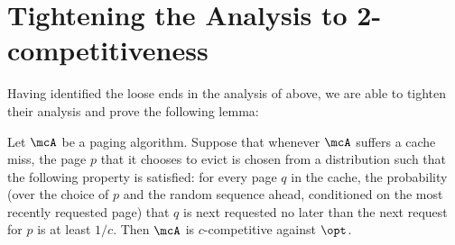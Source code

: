 \section{Tightening the Analysis to 2-competitiveness}
\label{sec:tight-analysis}
Having identified the loose ends in the analysis of \cite{lund1999paging} above, we are able to tighten their analysis and prove the following lemma:
\begin{lemma}
    \label{lem:tight-analysis}
    Let $\mcA$ be a paging algorithm. Suppose that whenever $\mcA$ suffers a cache miss, the page $p$ that it chooses to evict is chosen from a distribution such that the following property is satisfied: for every page $q$ in the cache, the probability (over the choice of $p$ and the random sequence ahead, conditioned on the most recently requested page) that $q$ is next requested no later than the next request for $p$ is at least $1/c$. Then $\mcA$ is $c$-competitive against $\opt$.
\end{lemma}
